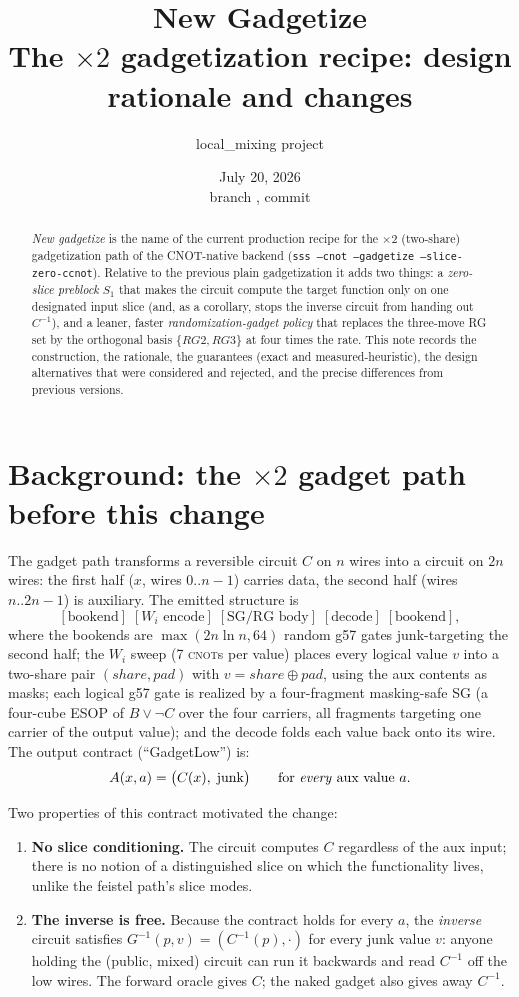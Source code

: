 \documentclass[11pt]{article}
\title{\textbf{New Gadgetize}\\[2pt]
\large The $\times 2$ gadgetization recipe: design rationale and changes}
\author{local\_mixing project}
\date{July 20, 2026 \\ \small branch \code{ssg-gen-mix-clean}, commit \code{49c8cc02}}
\newcommand{\CNOT}{\textsc{cnot}}
\newcommand{\code}[1]{\texttt{#1}}
\newcommand{\Sone}{S_1}
\begin{document}
\maketitle

\begin{abstract}
\noindent\emph{New gadgetize} is the name of the current production recipe for the
$\times 2$ (two-share) gadgetization path of the CNOT-native backend
(\code{sss --cnot --gadgetize --slice-zero-ccnot}). Relative to the previous
plain gadgetization it adds two things: a \emph{zero-slice preblock} $\Sone$
that makes the circuit compute the target function only on one designated
input slice (and, as a corollary, stops the inverse circuit from handing out
$C^{-1}$), and a leaner, faster \emph{randomization-gadget policy} that
replaces the three-move RG set by the orthogonal basis $\{RG2, RG3\}$ at four
times the rate. This note records the construction, the rationale, the
guarantees (exact and measured-heuristic), the design alternatives that were
considered and rejected, and the precise differences from previous versions.
\end{abstract}

\section{Background: the $\times 2$ gadget path before this change}

The gadget path transforms a reversible circuit $C$ on $n$ wires into a
circuit on $2n$ wires: the first half ($x$, wires $0..n{-}1$) carries data,
the second half (wires $n..2n{-}1$) is auxiliary. The emitted structure is
\[
[\text{bookend}]\;[\text{$W_i$ encode}]\;[\text{SG/RG body}]\;[\text{decode}]\;[\text{bookend}],
\]
where the bookends are $\max(2n\ln n, 64)$ random g57 gates junk-targeting
the second half; the $W_i$ sweep (7 \CNOT{}s per value) places every logical
value $v$ into a two-share pair $(\mathit{share},\mathit{pad})$ with
$v = \mathit{share}\oplus\mathit{pad}$, using the aux contents as masks; each
logical g57 gate is realized by a four-fragment masking-safe SG (a four-cube
ESOP of $B \lor \lnot C$ over the four carriers, all fragments targeting one
carrier of the output value); and the decode folds each value back onto its
wire. The output contract (``GadgetLow'') is:
\[
A(x, a) = \bigl(C(x),\; \text{junk}\bigr) \qquad \text{for \emph{every} aux value } a .
\]

Two properties of this contract motivated the change:
\begin{enumerate}
\item \textbf{No slice conditioning.} The circuit computes $C$ regardless of
the aux input; there is no notion of a distinguished slice on which the
functionality lives, unlike the feistel path's slice modes.
\item \textbf{The inverse is free.} Because the contract holds for every
$a$, the \emph{inverse} circuit satisfies $G^{-1}(p, v) = (C^{-1}(p), \cdot)$
for every junk value $v$: anyone holding the (public, mixed) circuit can
run it backwards and read $C^{-1}$ off the low wires. The forward oracle
gives $C$; the naked gadget also gives away $C^{-1}$.
\end{enumerate}
\end{document}
